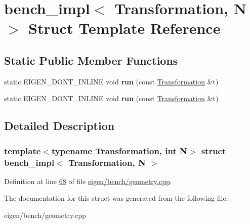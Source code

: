 \hypertarget{structbench__impl}{}\section{bench\+\_\+impl$<$ Transformation, N $>$ Struct Template Reference}
\label{structbench__impl}
\subsection*{Static Public Member Functions}
\begin{DoxyCompactItemize}
\item 
\mbox{\label{structbench__impl_abc05a5252aadc0e08decb704cb4250f8}} 
static E\+I\+G\+E\+N\+\_\+\+D\+O\+N\+T\+\_\+\+I\+N\+L\+I\+NE void {\bfseries run} (const \hyperlink{class_transformation}{Transformation} \&t)
\item 
\mbox{\label{structbench__impl_abc05a5252aadc0e08decb704cb4250f8}} 
static E\+I\+G\+E\+N\+\_\+\+D\+O\+N\+T\+\_\+\+I\+N\+L\+I\+NE void {\bfseries run} (const \hyperlink{class_transformation}{Transformation} \&t)
\end{DoxyCompactItemize}


\subsection{Detailed Description}
\subsubsection*{template$<$typename Transformation, int N$>$\newline
struct bench\+\_\+impl$<$ Transformation, N $>$}



Definition at line \hyperlink{eigen_2bench_2geometry_8cpp_source_l00068}{68} of file \hyperlink{eigen_2bench_2geometry_8cpp_source}{eigen/bench/geometry.\+cpp}.



The documentation for this struct was generated from the following file\+:\begin{DoxyCompactItemize}
\item 
eigen/bench/geometry.\+cpp\end{DoxyCompactItemize}

